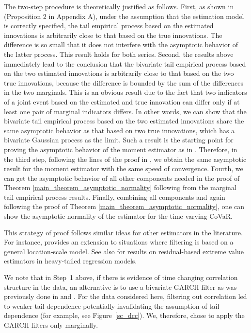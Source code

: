The two-step procedure is theoretically justified as follows. First, as shown in \cite{Hoga2019_sup} (Proposition 2 in Appendix A), under the assumption that the estimation model is correctly specified, the tail empirical process based on the estimated innovations is arbitrarily close to that based on the true innovations. The difference is so small that it does not interfere with the asymptotic behavior of the latter process. This result holds for both series. Second, the results above immediately lead to the conclusion that the bivariate tail empirical process based on the two estimated innovations is arbitrarily close to that based on the two true innovations, because the difference is bounded by the sum of the differences in the two marginals. This is an obvious result due to the fact that two indicators of a joint event based on the estimated and true innovation can differ only if at least one pair of marginal indicators differs. In other words, we can show that the bivariate tail empirical process based on the two estimated innovations share the same asymptotic behavior as that based on two true innovations, which has
a bivariate Gaussian process as the limit. Such a result is the starting point for proving the asymptotic behavior of the moment estimator as in \cite{Einmahl_etal2012_sup}. Therefore, in the third step, following the lines of the proof in \cite{Einmahl_etal2012_sup}, we obtain the same asymptotic result for the moment estimator with the same speed of convergence. Fourth, we can get the asymptotic behavior of all other components needed in the proof of Theorem \ref{main_theorem_asymptotic_normality} following from the marginal tail empirical process results. Finally, combining all components and again following the proof of Theorem \ref{main_theorem_asymptotic_normality}, one can show the asymptotic normality of the estimator for the time varying CoVaR.

This strategy of proof follows similar ideas for other estimators in the literature. For instance, \cite{Hoga2022} provides an extension to situations where filtering is based on a general location-scale model. See also \cite{Girard_etal2021} for results on residual-based extreme value estimators in heavy-tailed regression models.


We note that in Step~1 above, if there is evidence of time changing correlation structure in the data, an alternative is to use a bivariate GARCH filter as was previously done in \cite{Girardi2013_sup} and \cite{NoldeZhang2018_sup}. For the data considered here, filtering out correlation led to weaker tail dependence potentially invalidating the assumption of tail dependence (for example, see Figure~\ref{sc_dcc}). We, therefore, chose to apply the GARCH filters only marginally.  

